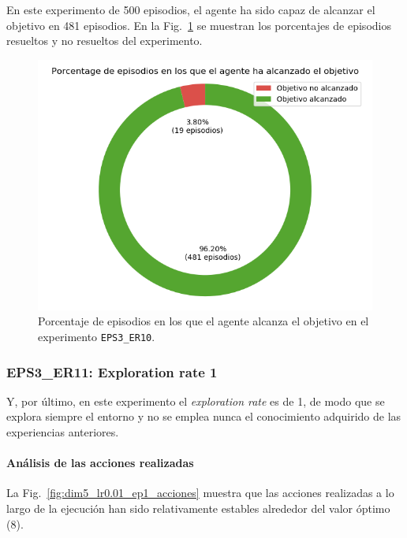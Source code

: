 En este experimento de 500 episodios, el agente ha sido capaz de alcanzar el objetivo en 481 episodios. En la Fig.~\ref{fig:dim5_lr0.01_ep0.9_porcentajeResuelto} se muestran los porcentajes de episodios resueltos y no resueltos del experimento. \\

\begin{figure}
    \centering
    \includegraphics[scale=0.4]{cap5_experimentacion/images/dim5_lr0.01_ep0.9_porcentajeResuelto.png}
    \caption{Porcentaje de episodios en los que el agente alcanza el objetivo en el experimento \texttt{EPS3\_ER10}.}
    \label{fig:dim5_lr0.01_ep0.9_porcentajeResuelto}
\end{figure}

\subsubsection{EPS3\_ER11: Exploration rate 1}

Y, por último, en este experimento el \textit{exploration rate} es de 1, de modo que se explora siempre el entorno y no se emplea nunca el conocimiento adquirido de las experiencias anteriores. 

\paragraph{Análisis de las acciones realizadas}

La Fig.~\ref{fig:dim5_lr0.01_ep1_acciones} muestra que las acciones realizadas a lo largo de la ejecución han sido relativamente estables alrededor del valor óptimo (8).\\

